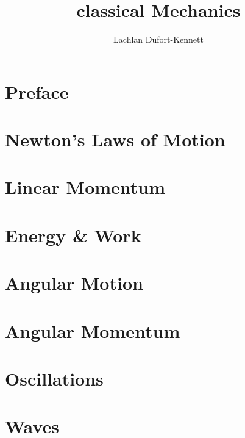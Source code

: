 \documentclass{lecture-notes}
\title{classical Mechanics}
\author{Lachlan Dufort-Kennett}
\begin{document}
    \frontmatter
    \maketitle
    \tableofcontents

    \chapter{Preface}

    \mainmatter
    \chapter{Newton's Laws of Motion}\label{chap:1}
    
    \chapter{Linear Momentum}\label{chap:2}
    
    \chapter{Energy \& Work}\label{chap:3}
    
    \chapter{Angular Motion}\label{chap:4}
    
    \chapter{Angular Momentum}\label{chap:5}
    
    \chapter{Oscillations}\label{chap:6}
    
    \chapter{Waves}\label{chap:7}
    

    \backmatter
    \nocite{*}
    
    
\end{document}
